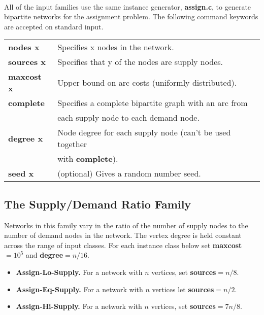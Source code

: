 \paragraph{ } 
All of the input families use the same instance generator, {\bf
assign.c}, to generate bipartite networks for the assignment problem.
The following command keywords are accepted on standard input.

\vspace{.2in} 
\begin{tabular}{ll} \hline
{\bf nodes x} & Specifies x nodes in the network. \\ {\bf sources x} &
Specifies that y of the nodes are supply nodes. \\ {\bf maxcost x} &
Upper bound on arc costs (uniformly distributed). \\ {\bf complete} &
Specifies a complete bipartite graph with an arc from \\ & each supply
node to each demand node. \\ {\bf degree x} & Node degree for each
supply node (can't be used together \\ & with {\bf complete}). \\ {\bf
seed x} & (optional) Gives a random number seed. \\ \hline
\end{tabular} 

\subsection{The Supply/Demand Ratio Family} 

Networks in this family vary in the ratio of the number of supply
nodes to the number of demand nodes in the network.  The vertex degree
is held constant across the range of input classes.  For each instance
class below set {\bf maxcost}$=10^5$ and {\bf degree}$=n/16$.

\begin{itemize}
\item {\bf Assign-Lo-Supply.}  For a network with $n$ vertices, 
set {\bf sources}$=n/8$.

\item {\bf Assign-Eq-Supply.} For a network with $n$ vertices let 
{\bf sources}$=n/2$.

\item {\bf Assign-Hi-Supply.}  For a network with $n$ vertices,
set {\bf sources}$=7n/8$.

\end{itemize} 

